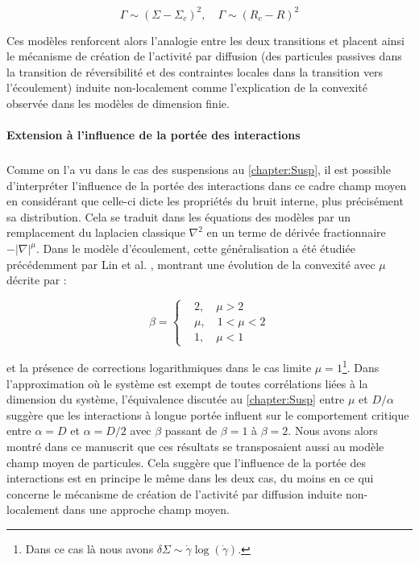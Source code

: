 \begin{equation}
	\Gamma \sim (\Sigma - \Sigma_c)^2,\quad \Gamma \sim (R_c-R)^2
\end{equation}

\noindent Ces modèles renforcent alors l'analogie entre les deux transitions et placent ainsi le mécanisme de création de l'activité par diffusion (des particules passives dans la transition de réversibilité et des contraintes locales dans la transition vers l'écoulement) induite non-localement comme l'explication de la convexité observée dans les modèles de dimension finie.

\paragraph{Extension à l'influence de la portée des interactions}

\subparagraph{}Comme on l'a vu dans le cas des suspensions au \autoref{chapter:Susp}, il est possible d’interpréter l'influence de la portée des interactions dans ce cadre champ moyen en considérant que celle-ci dicte les propriétés du bruit interne, plus précisément sa distribution. Cela se traduit dans les équations des modèles par un remplacement du laplacien classique $\nabla^2$ en un terme de dérivée fractionnaire $-|\nabla|^\mu$. Dans le modèle d'écoulement, cette généralisation a été étudiée précédemment par Lin et al. \cite{lin_mean-field_2016, lin_microscopic_2018}, montrant une évolution de la convexité avec $\mu$ décrite par :

\begin{equation}
	\beta = \left\{
	\begin{aligned}
	&2, \quad \mu > 2\\
	&\mu, \quad 1<\mu<2\\
	&1, \quad \mu < 1
	\end{aligned}
	\right.
\end{equation}

\noindent et la présence de corrections logarithmiques dans le cas limite $\mu = 1$\footnote{Dans ce cas là nous avons $\delta\Sigma \sim \dot{\gamma}\log(\dot{\gamma})$.}. Dans l'approximation où le système est exempt de toutes corrélations liées à la dimension du système, l'équivalence discutée au \autoref{chapter:Susp} entre $\mu$ et $D/\alpha$ suggère que les interactions à longue portée influent sur le comportement critique entre $\alpha = D$ et $\alpha = D/2$ avec $\beta$ passant de $\beta = 1$ à $\beta = 2$. Nous avons alors montré dans ce manuscrit que ces résultats se transposaient aussi au modèle champ moyen de particules. Cela suggère que l'influence de la portée des interactions est en principe le même dans les deux cas, du moins en ce qui concerne le mécanisme de création de l'activité par diffusion induite non-localement dans une approche champ moyen.

